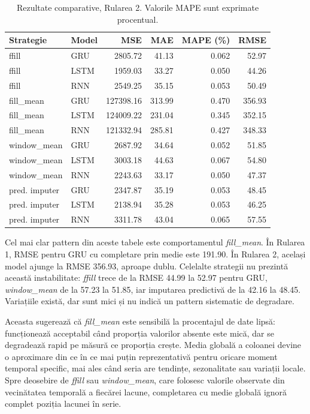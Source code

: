\begin{table}[H]
\centering
\caption{Rezultate comparative, Rularea 2. Valorile MAPE sunt exprimate procentual.}
\label{tab:run2}
\begin{tabular}{llrrrr}
\toprule
\textbf{Strategie} & \textbf{Model} & \textbf{MSE} & \textbf{MAE} & \textbf{MAPE (\%)} & \textbf{RMSE} \\
\midrule
ffill              & GRU  & 2805.72   & 41.13  & 0.062 & 52.97  \\
ffill              & LSTM & 1959.03   & 33.27  & 0.050 & 44.26  \\
ffill              & RNN  & 2549.25   & 35.15  & 0.053 & 50.49  \\
\midrule
fill\_mean         & GRU  & 127398.16 & 313.99 & 0.470 & 356.93 \\
fill\_mean         & LSTM & 124009.22 & 231.04 & 0.345 & 352.15 \\
fill\_mean         & RNN  & 121332.94 & 285.81 & 0.427 & 348.33 \\
\midrule
window\_mean       & GRU  & 2687.92   & 34.64  & 0.052 & 51.85  \\
window\_mean       & LSTM & 3003.18   & 44.63  & 0.067 & 54.80  \\
window\_mean       & RNN  & 2243.63   & 33.17  & 0.050 & 47.37  \\
\midrule
pred. imputer      & GRU  & 2347.87   & 35.19  & 0.053 & 48.45  \\
pred. imputer      & LSTM & 2138.94   & 35.28  & 0.053 & 46.25  \\
pred. imputer      & RNN  & 3311.78   & 43.04  & 0.065 & 57.55  \\
\bottomrule
\end{tabular}
\end{table}

Cel mai clar pattern din aceste tabele este comportamentul \textit{fill\_mean}. În Rularea 1, RMSE pentru GRU cu completare prin medie este 191.90. În Rularea 2, același model ajunge la RMSE 356.93, aproape dublu. Celelalte strategii nu prezintă această instabilitate: \textit{ffill} trece de la RMSE 44.99 la 52.97 pentru GRU, \textit{window\_mean} de la 57.23 la 51.85, iar imputarea predictivă de la 42.16 la 48.45. Variațiile există, dar sunt mici și nu indică un pattern sistematic de degradare.

Aceasta sugerează că \textit{fill\_mean} este sensibilă la procentajul de date lipsă: funcționează acceptabil când proporția valorilor absente este mică, dar se degradează rapid pe măsură ce proporția crește. Media globală a coloanei devine o aproximare din ce în ce mai puțin reprezentativă pentru oricare moment temporal specific, mai ales când seria are tendințe, sezonalitate sau variații locale. Spre deosebire de \textit{ffill} sau \textit{window\_mean}, care folosesc valorile observate din vecinătatea temporală a fiecărei lacune, completarea cu medie globală ignoră complet poziția lacunei în serie.

